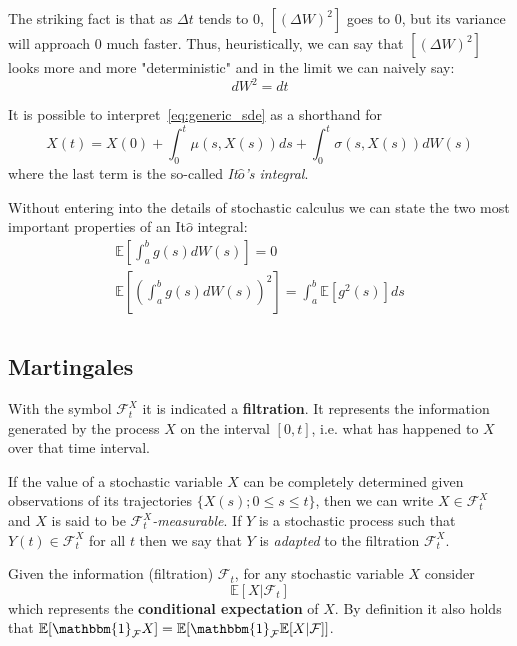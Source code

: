 \documentclass[12pt,a4paper]{book}
\begin{document}
The striking fact is that as $\Delta t$ tends to 0, $[(\Delta W)^2]$ goes to 0, but its variance will approach 0 much faster.
Thus, heuristically, we can say that $[(\Delta W)^2]$ looks more and more "deterministic" and in the limit we can naively say:
\begin{equation*}
\boxed{dW^2 = dt}
\end{equation*}

It is possible to interpret~\ref{eq:generic_sde} as a shorthand for 
\begin{equation*}
X(t) = X(0) + \int_0^t \mu(s,X(s)) ds + \int_0^t \sigma(s,X(s)) dW(s)
\end{equation*}
where the last term is the so-called \emph{It$\hat{o}$'s integral}.

Without entering into the details of stochastic calculus we can state the two most important properties of an It$\hat{o}$ integral:
\begin{equation*}
\begin{gathered}
\mathbb{E}\left[\int_a^b g(s) dW(s)\right] = 0 \\
\mathbb{E}\left[\left(\int_a^b g(s) dW(s)\right)^2\right] = \int_a^b\mathbb{E}[g^2(s)]ds\\
\end{gathered}
\end{equation*}

\subsection{Martingales}
With the symbol $\mathcal{F}^X_t$ it is indicated a \textbf{filtration}. It represents the information generated by the process $X$ on the interval $[0, t]$, i.e. what has happened to $X$ over that time interval. 

If the value of a stochastic variable $X$ can be completely determined given observations of its trajectories $\{X(s); 0\leq s \leq t\}$, then we can write $X\in\mathcal{F}_t^X$ and $X$ is said to be $\mathcal{F}_t^X$\emph{-measurable}.
If $Y$ is a stochastic process such that $Y(t)\in\mathcal{F}_t^X$ for all $t$ then we say that $Y$ is \emph{adapted} to the filtration $\mathcal{F}_t^X$. 

Given the information (filtration) $\mathcal{F}_t$, for any stochastic variable $X$ consider
\begin{equation*}
	\mathbb{E}[X|\mathcal{F}_t]
\end{equation*}
which represents the \textbf{conditional expectation} of $X$.
By definition it also holds that $\mathbb{E}[\mathbbm{1}_{\mathcal{F}}X] = \mathbb{E}[\mathbbm{1}_{\mathcal{F}}\mathbb{E}[X|\mathcal{F}]]$.
\end{document}
